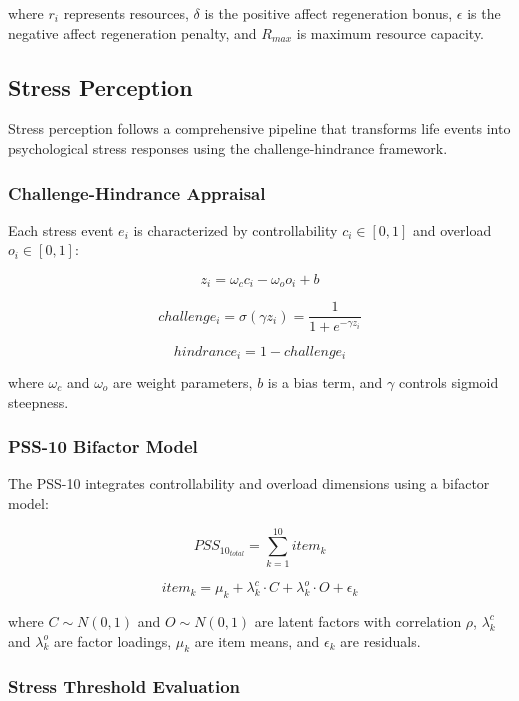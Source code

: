 \documentclass[
  letterpaper,
  DIV=11,
  numbers=noendperiod]{scrartcl}
\begin{document}
where \(r_i\) represents resources, \(\delta\) is the positive affect
regeneration bonus, \(\epsilon\) is the negative affect regeneration
penalty, and \(R_{max}\) is maximum resource capacity.

\subsection{Stress Perception}\label{stress-perception}

Stress perception follows a comprehensive pipeline that transforms life
events into psychological stress responses using the challenge-hindrance
framework.

\subsubsection{Challenge-Hindrance
Appraisal}\label{challenge-hindrance-appraisal}

Each stress event \(e_i\) is characterized by controllability
\(c_i \in [0,1]\) and overload \(o_i \in [0,1]\):

\[z_i = \omega_c c_i - \omega_o o_i + b\]

\[challenge_i = \sigma(\gamma z_i) = \frac{1}{1 + e^{-\gamma z_i}}\]

\[hindrance_i = 1 - challenge_i\]

where \(\omega_c\) and \(\omega_o\) are weight parameters, \(b\) is a
bias term, and \(\gamma\) controls sigmoid steepness.

\subsubsection{PSS-10 Bifactor Model}\label{pss-10-bifactor-model}

The PSS-10 integrates controllability and overload dimensions using a
bifactor model:

\[PSS_{10_{total}} = \sum_{k=1}^{10} item_k\]

\[item_k = \mu_k + \lambda_k^c \cdot C + \lambda_k^o \cdot O + \epsilon_k\]

where \(C \sim N(0,1)\) and \(O \sim N(0,1)\) are latent factors with
correlation \(\rho\), \(\lambda_k^c\) and \(\lambda_k^o\) are factor
loadings, \(\mu_k\) are item means, and \(\epsilon_k\) are residuals.

\subsubsection{Stress Threshold
Evaluation}\label{stress-threshold-evaluation}
\end{document}
